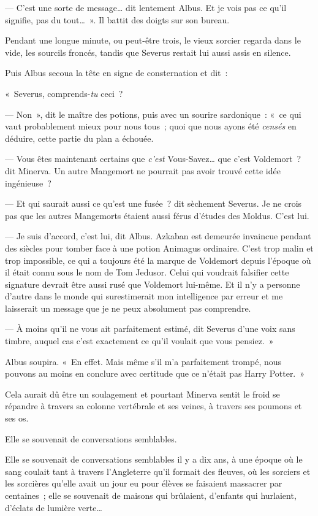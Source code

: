 --- C'est une sorte de message… dit lentement Albus. Et je vois pas ce qu'il signifie, pas du tout…~». Il battit des doigts sur son bureau.

Pendant une longue minute, ou peut-être trois, le vieux sorcier regarda dans le vide, les sourcils froncés, tandis que Severus restait lui aussi assis en silence.

Puis Albus secoua la tête en signe de consternation et dit~:

«~Severus, comprends-\emph{tu} ceci~?

--- Non~», dit le maître des potions, puis avec un sourire sardonique~: «~ce qui vaut probablement mieux pour nous tous~; quoi que nous ayons été \emph{censés} en déduire, cette partie du plan a échouée.

--- Vous êtes maintenant certains que \emph{c'est} Vous-Savez… que c'est Voldemort~? dit Minerva. Un autre Mangemort ne pourrait pas avoir trouvé cette idée ingénieuse~?

--- Et qui saurait aussi ce qu'est une fusée~? dit sèchement Severus. Je ne crois pas que les autres Mangemorts étaient aussi férus d'études des Moldus. C'est lui.

--- Je suis d'accord, c'est lui, dit Albus. Azkaban est demeurée invaincue pendant des siècles pour tomber face à une potion Animagus ordinaire. C'est trop malin et trop impossible, ce qui a toujours été la marque de Voldemort depuis l'époque où il était connu sous le nom de Tom Jedusor. Celui qui voudrait falsifier cette signature devrait être aussi rusé que Voldemort lui-même. Et il n'y a personne d'autre dans le monde qui surestimerait mon intelligence par erreur et me laisserait un message que je ne peux absolument pas comprendre.

--- À moins qu'il ne vous ait parfaitement estimé, dit Severus d'une voix sans timbre, auquel cas c'est exactement ce qu'il voulait que vous pensiez.~»

Albus soupira. «~En effet. Mais même s'il m'a parfaitement trompé, nous pouvons au moins en conclure avec certitude que ce n'était pas Harry Potter.~»

Cela aurait dû être un soulagement et pourtant Minerva sentit le froid se répandre à travers sa colonne vertébrale et ses veines, à travers ses poumons et ses os.

Elle se souvenait de conversations semblables.

Elle se souvenait de conversations semblables il y a dix ans, à une époque où le sang coulait tant à travers l'Angleterre qu'il formait des fleuves, où les sorciers et les sorcières qu'elle avait un jour eu pour élèves se faisaient massacrer par centaines~; elle se souvenait de maisons qui brûlaient, d'enfants qui hurlaient, d'éclats de lumière verte…

